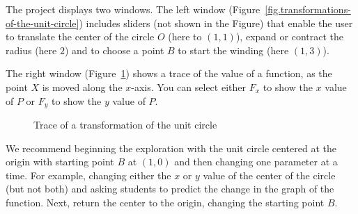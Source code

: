 The project displays two windows. The left window  (Figure~\ref{fig.transformations-of-the-unit-circle}) includes sliders (not shown in the Figure) that enable the user to translate the center of the circle $O$ (here to $(1,1)$), expand or contract the radius (here $2$) and to choose a point $B$ to start the winding (here $(1,3)$).

The right window (Figure~\ref{fig.trace-of-a-transformation-of-the-unit-circle}) shows a trace of the value of a function, as the point $X$ is moved along the $x$-axis. You can select either $F_x$ to show the $x$ value of $P$ or $F_y$ to show the $y$ value of $P$.

\begin{figure}[hbt]
\begin{center}
\caption{Trace of a transformation of the unit circle}\label{fig.trace-of-a-transformation-of-the-unit-circle}
\end{center}
\end{figure}

We recommend beginning the exploration with the unit circle centered at the origin with starting point $B$ at $(1,0)$ and then changing one parameter at a time.
For example, changing either the $x$ or $y$ value of the center of the circle (but not both) and asking students to predict the change in the graph of the function.
Next, return the center to the origin, changing the starting point $B$.

